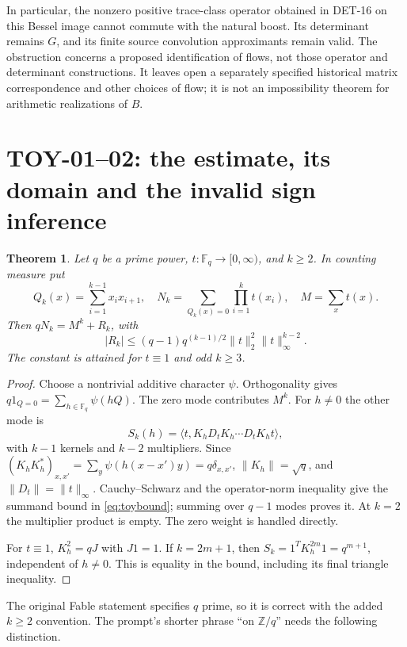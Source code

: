 \documentclass[11pt,a4paper]{article}
\newcommand{\Z}{\mathbb Z}
\newcommand{\F}{\mathbb F}
\newcommand{\fid}[1]{\textsf{#1}}
\newtheorem*{theorem}{Theorem}
\begin{document}
In particular, the nonzero positive trace-class operator obtained
in \fid{DET-16} on this Bessel image cannot commute with the
natural boost. Its determinant remains \(G\), and its finite
source convolution approximants remain valid. The obstruction
concerns a proposed identification of flows, not those operator
and determinant constructions. It leaves open a separately
specified historical matrix correspondence and other choices of
flow; it is not an impossibility theorem for arithmetic
realizations of \(B\).

\section{TOY-01--02: the estimate, its domain and the invalid sign inference}
\begin{theorem}
Let $q$ be a prime power, $t:\F_q\to[0,\infty)$, and $k\ge2$. In counting measure put
\[
 Q_k(x)=\sum_{i=1}^{k-1}x_ix_{i+1},\quad
 N_k=\sum_{Q_k(x)=0}\prod_{i=1}^kt(x_i),\quad M=\sum_x t(x).
\]
Then $qN_k=M^k+R_k$, with
\begin{equation}\label{eq:toybound}
 |R_k|\le(q-1)q^{(k-1)/2}\|t\|_2^2\|t\|_\infty^{k-2}.
\end{equation}
The constant is attained for $t\equiv1$ and odd $k\ge3$.
\end{theorem}
\begin{proof}
Choose a nontrivial additive character $\psi$. Orthogonality gives
$q1_{Q=0}=\sum_{h\in\F_q}\psi(hQ)$. The zero mode contributes $M^k$. For $h\ne0$ the other mode is
\[
 S_k(h)=\langle t,K_hD_tK_h\cdots D_tK_ht\rangle,
\]
with $k-1$ kernels and $k-2$ multipliers. Since
$(K_hK_h^*)_{x,x'}=\sum_y\psi(h(x-x')y)=q\delta_{x,x'}$,
$\|K_h\|=\sqrt q$, and $\|D_t\|=\|t\|_\infty$. Cauchy--Schwarz and the operator-norm inequality give the summand bound in \eqref{eq:toybound}; summing over $q-1$ modes proves it. At $k=2$ the multiplier product is empty. The zero weight is handled directly.

For $t\equiv1$, $K_h^2=qJ$ with $J1=1$. If $k=2m+1$, then $S_k=1^TK_h^{2m}1=q^{m+1}$, independent of $h\ne0$. This is equality in the bound, including its final triangle inequality.
\end{proof}
The original Fable statement specifies $q$ prime, so it is correct with the added $k\ge2$ convention. The prompt's shorter phrase ``on $\Z/q$'' needs the following distinction.
\end{document}

